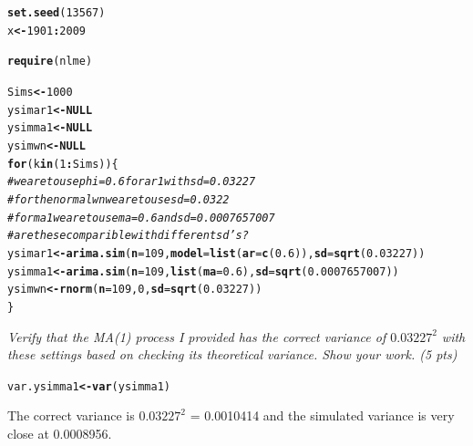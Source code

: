 \documentclass[11pt]{article}\usepackage[]{graphicx}\usepackage[]{color}
\makeatletter
\newcommand{\hlnum}[1]{\textcolor[rgb]{0,0,0}{#1}}%
\newcommand{\hlcom}[1]{\textcolor[rgb]{0.4,0.4,0.4}{\textit{#1}}}%
\newcommand{\hlopt}[1]{\textcolor[rgb]{0,0,0}{\textbf{#1}}}%
\newcommand{\hlstd}[1]{\textcolor[rgb]{0,0,0}{#1}}%
\newcommand{\hlkwa}[1]{\textcolor[rgb]{0,0,0}{\textbf{#1}}}%
\newcommand{\hlkwb}[1]{\textcolor[rgb]{0,0,0}{\textbf{#1}}}%
\newcommand{\hlkwc}[1]{\textcolor[rgb]{0,0,0}{\textbf{#1}}}%
\newcommand{\hlkwd}[1]{\textcolor[rgb]{0,0,0}{\textbf{#1}}}%
\newenvironment{kframe}{%
 \def\at@end@of@kframe{}%
 \ifinner\ifhmode%
  \def\at@end@of@kframe{\end{minipage}}%
  \begin{minipage}{\columnwidth}%
 \fi\fi%
 \def\FrameCommand##1{\hskip\@totalleftmargin \hskip-\fboxsep
 \colorbox{shadecolor}{##1}\hskip-\fboxsep
     \hskip-\linewidth \hskip-\@totalleftmargin \hskip\columnwidth}%
 \MakeFramed {\advance\hsize-\width
   \@totalleftmargin\z@ \linewidth\hsize
   \@setminipage}}%
 {\par\unskip\endMakeFramed%
 \at@end@of@kframe}
\newenvironment{knitrout}{}{} %
\makeatother
\begin{document}
\begin{enumerate}
\begin{enumerate}
\begin{knitrout}\footnotesize
{}\color{fgcolor}\begin{kframe}
\begin{alltt}
\hlkwd{set.seed}\hlstd{(}\hlnum{13567}\hlstd{)}
\hlstd{x}\hlkwb{<-}\hlnum{1901}\hlopt{:}\hlnum{2009}

\hlkwd{require}\hlstd{(nlme)}

\hlstd{Sims}\hlkwb{<-}\hlnum{1000}
\hlstd{ysimar1} \hlkwb{<-} \hlkwa{NULL}
\hlstd{ysimma1} \hlkwb{<-} \hlkwa{NULL}
\hlstd{ysimwn} \hlkwb{<-} \hlkwa{NULL}
\hlkwa{for} \hlstd{(k} \hlkwa{in} \hlstd{(}\hlnum{1}\hlopt{:}\hlstd{Sims))\{}
  \hlcom{#we are to use phi = 0.6 for ar1 with sd = 0.03227}
  \hlcom{#for the normal wn we are to use sd = 0.0322}
  \hlcom{#for ma1 we are to use ma = 0.6 and sd = 0.0007657007}
  \hlcom{#are these comparible with different sd's?}
\hlstd{ysimar1}\hlkwb{<-}\hlkwd{arima.sim}\hlstd{(}\hlkwc{n}\hlstd{=}\hlnum{109}\hlstd{,}\hlkwc{model}\hlstd{=}\hlkwd{list}\hlstd{(}\hlkwc{ar}\hlstd{=}\hlkwd{c}\hlstd{(}\hlnum{0.6}\hlstd{)),}\hlkwc{sd}\hlstd{=}\hlkwd{sqrt}\hlstd{(}\hlnum{0.03227}\hlstd{))}
\hlstd{ysimma1}\hlkwb{<-}\hlkwd{arima.sim}\hlstd{(}\hlkwc{n}\hlstd{=}\hlnum{109}\hlstd{,}\hlkwd{list}\hlstd{(}\hlkwc{ma}\hlstd{=}\hlnum{0.6}\hlstd{),}\hlkwc{sd}\hlstd{=}\hlkwd{sqrt}\hlstd{(}\hlnum{0.0007657007}\hlstd{))}
\hlstd{ysimwn}\hlkwb{<-}\hlkwd{rnorm}\hlstd{(}\hlkwc{n}\hlstd{=}\hlnum{109}\hlstd{,}\hlnum{0}\hlstd{,}\hlkwc{sd} \hlstd{=} \hlkwd{sqrt}\hlstd{(}\hlnum{0.03227}\hlstd{))}
\hlstd{\}}
\end{alltt}
\end{kframe}
\end{knitrout}

{\it Verify that the MA(1) process I provided has the correct variance of $0.03227^2$ with these settings based on checking its theoretical variance. Show your work. (5 pts)}

\begin{knitrout}\footnotesize
{}\color{fgcolor}\begin{kframe}
\begin{alltt}
\hlstd{var.ysimma1} \hlkwb{<-} \hlkwd{var}\hlstd{(ysimma1)}
\end{alltt}
\end{kframe}
\end{knitrout}

The correct variance is $0.03227^2$ = 0.0010414 and the simulated variance is very close at 0.0008956.


\end{enumerate}
\end{enumerate}
\end{document}
